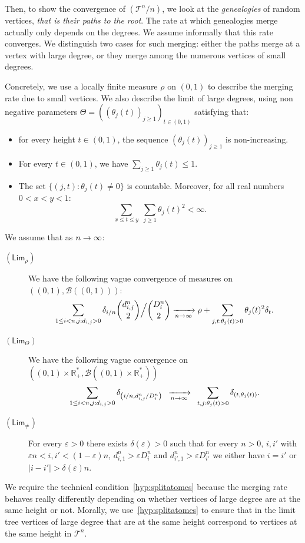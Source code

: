 \documentclass[10pt]{amsart}
\makeatletter
\theoremstyle{definition}\newtheorem{defi}[theo]{Definition}\newtheorem{rema}[theo]{Remark}\newtheorem{exam}[theo]{Example}\newtheorem{exem}[theo]{Example}\newtheorem{nota}[theo]{Notation}
\newcommand{\optionaldesc}[2]{
\phantomsection #1\protected@edef\@currentlabel{#1}\label{#2}
}
\newcommand{\e}{\varepsilon}
\newcommand{\cv}[1][n]{\enskip\xrightarrow[#1 \to \infty]{}\enskip}
\newcommand{\R}{\mathbb{R}}
\newcommand{\1}{\mathbbm{1}}
\newcommand{\T}{\mathcal{T}}
\newcommand{\clB}{\mathcal{B}}
\newcommand{\sLim}{\mathsf{Lim}}
\let\originalleft\left
\let\originalright\right
\renewcommand{\left}{\mathopen{}\mathclose\bgroup\originalleft}
\renewcommand{\right}{\aftergroup\egroup\originalright}
\renewcommand*{\to}{\mathchoice{\longrightarrow}{\rightarrow}{\rightarrow}{\rightarrow}}
\makeatother
\begin{document}
Then, to show the convergence of $(\T^n/n)$, we look at the \emph{genealogies} of random vertices, \emph{that is their paths to the root}. The rate at which genealogies merge actually only depends on the degrees. We assume informally that this rate converges. We distinguish two cases for such merging: either the paths merge at a vertex with large degree, or they merge among the numerous vertices of small degrees.

Concretely, we use a locally finite measure $\rho$ on $(0,1)$ to describe the merging rate due to small vertices. We also describe the limit of large degrees, using non negative parameters $\Theta=((\theta_j(t))_{j\ge 1})_{t\in (0,1)}$ satisfying that:
\begin{itemize}
\item for every height $t\in (0,1)$, the sequence $(\theta_j(t))_{j\geq 1}$ is non-increasing.
\item For every $t\in (0,1)$, we have $
\sum_{j\ge 1} \theta_j(t) \le 1. $
\item The set $\{(j,t):\theta_j(t)\neq 0\}$ is countable. Moreover, for {all} real numbers $0<x<y<1$:
\begin{equation}\label{eq:pas de coalescence avec proba non nulle}
\sum_{x \le t \le y}\; \sum_{j\ge 1} \theta_j(t)^2 < \infty.
\end{equation}
\end{itemize}



We assume {that} as $n\to \infty$:
\smallskip
\begin{mdframed}[linecolor=black!60]
\begin{description}
\item[\textcolor{link}{\optionaldesc{$(\sLim_{\rho})$}{hyp:coalescence}}] We have the following vague convergence of measures on $((0,1),\clB((0,1)))$:
\[
\sum_{1\le i<n,j:d_{i,j}>0} \delta_{i/n} \binom{d^n_{i,j}}{2}\Big/{\binom{D^n_{i}}{2}} \xrightarrow[n\to \infty]{} \rho + \sum_{j,t:\theta_{j}(t)>0} \theta_j(t)^2\delta_{t}.
\]
\item[\textcolor{link}{\optionaldesc{$(\sLim_{\Theta})$}{hyp:atomes}}] We have the following {vague} convergence on $((0,1)\times \R_{+}^*,\clB((0,1)\times \R_{+}^*))$
\[
\sum_{1 \le i<n,j: d_{i,j}>0} \delta_{\left(i/n, d^n_{i,j}/D^n_i\right)}
\cv[n]
\sum_{t,j:\theta_{j}(t)>0} \delta_{(t, \theta_j(t))}.
\]
\item[\textcolor{link}{\optionaldesc{$(\sLim_{\neq})$}{hyp:splitatomes}}] For every $\e>0$ there exists $\delta(\e)>0$ such that for every $n>0$, $i, i'$ with $\e n <i,i'<(1-\e) n${,} $d^n_{i,1}>\e D_i^n$ and $d^n_{i',1}>\e D_{i'}^n$ we either have $i=i'$ or $|i-i'|>\delta(\e) n$.
\end{description}
\end{mdframed}
\smallskip
We require the technical condition~\ref{hyp:splitatomes} because the merging rate behaves really differently {depending on whether} vertices of large degree are at the same height or not. Morally, we use~\ref{hyp:splitatomes} to ensure that in the limit tree vertices of large degree that are at the same height correspond to vertices at the same height in $\T^n$.
\end{document}
